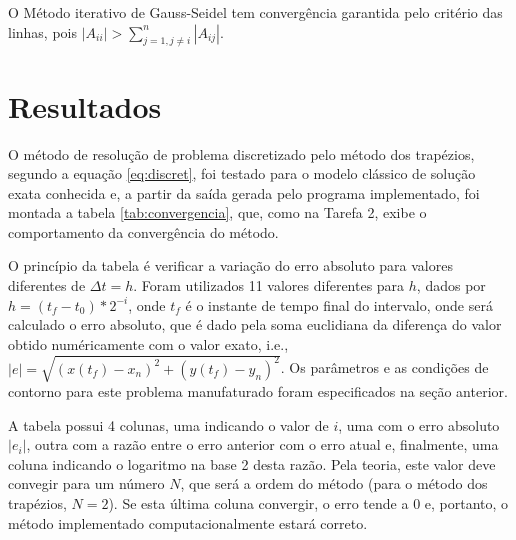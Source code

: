 \documentclass[a4paper,10pt]{article}
\begin{document}
  
  
  O Método iterativo de Gauss-Seidel tem convergência garantida pelo critério das linhas, pois $|A_{ii}| > \sum\limits_{j=1, j\not=i}^{n}|A_{ij}|$.

  \section{Resultados}
  O método de resolução de problema discretizado pelo método dos trapézios, segundo a equação \ref{eq:discret}, foi testado para o modelo clássico de solução exata conhecida e, a partir da saída gerada pelo programa implementado, foi montada a tabela \ref{tab:convergencia}, que, como na Tarefa 2, exibe o comportamento da convergência do método.
  
  O princípio da tabela é verificar a variação do erro absoluto para valores diferentes de $\Delta t = h$. Foram utilizados 11 valores diferentes para $h$, dados por $h = (t_{f} - t_{0}) * 2 ^ {- i}$, onde $t_{f}$ é o instante de tempo final do intervalo, onde será calculado o erro absoluto, que é dado pela soma euclidiana da diferença do valor obtido numéricamente com o valor exato, i.e., $|e| = \sqrt{(x(t_{f}) - x_{n})^{2} + (y(t_{f}) - y_{n})^2}$. Os parâmetros e as condições de contorno para este problema manufaturado foram especificados na seção anterior.
  
  A tabela possui 4 colunas, uma indicando o valor de $i$, uma com o erro absoluto $|e_{i}|$, outra com a razão entre o erro anterior com o erro atual e, finalmente, uma coluna indicando o logaritmo na base 2 desta razão. Pela teoria, este valor deve convegir para um número $N$, que será a ordem do método (para o método dos trapézios, $N = 2$). Se esta última coluna convergir, o erro tende a 0 e, portanto, o método implementado computacionalmente estará correto.
\end{document}
